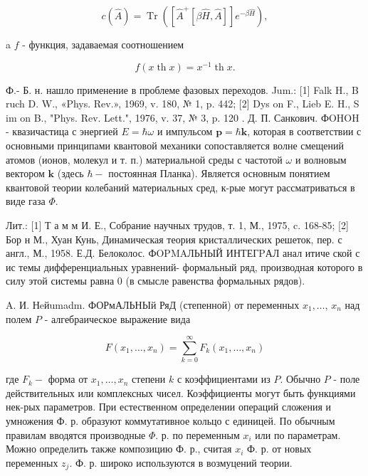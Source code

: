 \documentclass[10pt]{article}
\begin{document}
\[

c(\hat{A})=\operatorname{Tr}\left(\left[\hat{A}^{+}[\beta \hat{H}, \hat{A}]\right] e^{-\beta \hat{H}}\right),

\]



a $f$ - функция, задаваемая соотношением



\[

f(x \operatorname{th} x)=x^{-1} \operatorname{th} x .

\]



Ф.- Б. н. нашло применение в проблеме фазовых переходов. Jum.: [1] Falk H., B ruch D. W., «Phys. Rev.», 1969, v. 180, № 1, p. 442; [2] Dys on F., Lieb E. H., S im on B., "Phys. Rev. Lett.", 1976, v. 37, № 3, p. 120 . Д. П. Санкович. ФOHOH - квазичастица с энергией $E=\hbar \omega$ и импульсом $\boldsymbol{p}=\hbar \boldsymbol{k}$, которая в соответствии с основными принципами квантовой механики сопоставляется волне смещений атомов (ионов, молекул и т. п.) материальной среды с частотой $\omega$ и волновым вектором $\boldsymbol{k}$ (здесь $\hbar-$ постоянная Планка). Является основным понятием квантовой теории колебаний материальных сред, к-рые могут рассматриваться в виде газа $\Phi$.



Лит.: [1] Т а м м И. Е., Собрание научных трудов, т. 1, М., 1975, c. 168-85; [2] Бор н М., Хуан Кунь, Динамическая теория кристаллических решеток, пер. с англ., М., 1958. Е.Д. Белоколос. ФOPMAЛЬНЫЙ ИНТЕГPАЛ анал итиче ской с ис темы дифференциальных уравнений- формальный ряд, производная которого в силу этой системы равна 0 (в смысле равенства формальных рядов).



A. И. Нeйumadm. ФОРмАЛЬНЫй РяД (степенной) от переменных $x_{1}, \ldots$, $x_{n}$ над полем $P$ - алгебраическое выражение вида



\[

F\left(x_{1}, \ldots, x_{n}\right)=\sum_{k=0}^{\infty} F_{k}\left(x_{1}, \ldots, x_{n}\right)

\]



где $F_{k}-$ форма от $x_{1}, \ldots, x_{n}$ степени $k$ с коэффициентами из $P$. Обычно $P$ - поле действительных или комплексных чисел. Коэффициенты могут быть функциями нек-рых параметров. При естественном определении операций сложения и умножения Ф. р. образуют коммутативное кольцо с единицей. По обычным правилам вводятся производные $\Phi$. р. по переменным $x_{i}$ или по параметрам. Можно определить также композицию Ф. р., считая $x_{i}$ Ф. р. от новых переменных $z_{j}$. Ф. р. широко используются в возмуцений теории.
\end{document}
